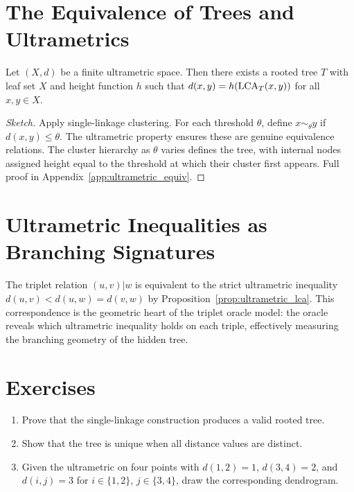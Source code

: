 \section{The Equivalence of Trees and Ultrametrics}

\begin{theorem}
\label{thm:ultrametric_tree}
Let $(X, d)$ be a finite ultrametric space. Then there exists a rooted tree $T$ with leaf set $X$ and height function $h$ such that $d(x,y) = h(\operatorname{LCA}_T(x,y))$ for all $x, y \in X$.
\end{theorem}

\begin{proof}[Sketch]
Apply single-linkage clustering. For each threshold $\theta$, define $x \sim_\theta y$ if $d(x,y) \leq \theta$. The ultrametric property ensures these are genuine equivalence relations. The cluster hierarchy as $\theta$ varies defines the tree, with internal nodes assigned height equal to the threshold at which their cluster first appears. Full proof in Appendix~\ref{app:ultrametric_equiv}.
\end{proof}

\section{Ultrametric Inequalities as Branching Signatures}

The triplet relation $(u,v)|w$ is equivalent to the strict ultrametric inequality
$d(u,v) < d(u,w) = d(v,w)$
by Proposition~\ref{prop:ultrametric_lca}. This correspondence is the geometric heart of the triplet oracle model: the oracle reveals which ultrametric inequality holds on each triple, effectively measuring the branching geometry of the hidden tree.

\section{Exercises}

\begin{enumerate}
  \item Prove that the single-linkage construction produces a valid rooted tree.
  \item Show that the tree is unique when all distance values are distinct.
  \item Given the ultrametric on four points with $d(1,2)=1$, $d(3,4)=2$, and $d(i,j)=3$ for $i\in\{1,2\}$, $j\in\{3,4\}$, draw the corresponding dendrogram.
\end{enumerate}
